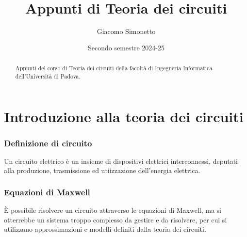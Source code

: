 \documentclass[a4paper]{article}
\title{Appunti di Teoria dei circuiti}
\author{Giacomo Simonetto}
\date{Secondo semestre 2024-25}
\newcommand\nab{\vec{\nabla}} %
\begin{document}
\maketitle
\begin{abstract}
	Appunti del corso di Teoria dei circuiti della facoltà di Ingegneria Informatica dell'Università di Padova.
\end{abstract}

\newpage

\tableofcontents

\newpage

\section{Introduzione alla teoria dei circuiti}
\subsubsection*{Definizione di circuito}
Un circuito elettrico è un insieme di dispositivi elettrici interconnessi, deputati alla produzione, trasmissione ed utiizzazione
dell'energia elettrica.

\subsubsection*{Equazioni di Maxwell}
È possibile risolvere un circuito attraverso le equazioni di Maxwell, ma si otterrebbe un sistema troppo complesso da gestire e da
risolvere, per cui si utilizzano approssimazioni e modelli definiti dalla teoria dei circuiti.

\end{document}
